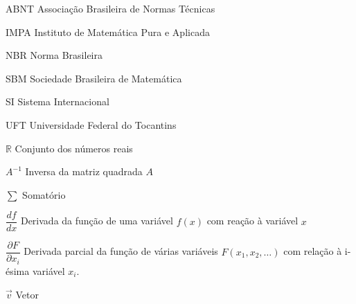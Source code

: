 
\listoftables*
\cleardoublepage


\begin{siglas}
	\item[ABNT] Associação Brasileira de Normas Técnicas
	\item[IMPA] Instituto de Matemática Pura e Aplicada
	\item[NBR] Norma Brasileira
	\item[SBM] Sociedade Brasileira de Matemática
	\item[SI] Sistema Internacional
	\item[UFT] Universidade Federal do Tocantins
\end{siglas}


\begin{simbolos}
  \item[$ \mathbb{R} $] Conjunto dos números reais
  \item[$ A^{-1} $] Inversa da matriz quadrada $A$
  \item[$ \sum $] Somatório
  \item[$ \dfrac{df}{dx} $] Derivada da função de uma variável $f(x)$ com reação à variável $x$
  \item[$ \dfrac{\partial F}{\partial x_i} $] Derivada parcial da função de várias variáveis $F (x_1, x_2, \ldots)$ com relação à i-ésima variável $x_i$.
  \item[$ \overrightarrow{v} $] Vetor
\end{simbolos}


\tableofcontents*
\cleardoublepage
